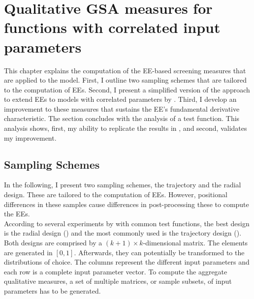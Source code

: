 \documentclass[a4paper,12pt]{article}
\begin{document}
\newpage %

\section{Qualitative GSA measures for functions with correlated input parameters}
\thispagestyle{plain} %

This chapter explains the computation of the EE-based screening measures that are applied to the \cite{Keane.1994} model.
First, I outline two sampling schemes that are tailored to the computation of EEs. Second, I present a simplified version of the approach to extend EEs to models with correlated parameters by \cite{ge2017extending}. Third, I develop an improvement to these measures that sustains the EE's fundamental derivative characteristic. The section concludes with the analysis of a test function. This analysis shows, first, my ability to replicate the results in \cite{ge2017extending}, and second, validates my improvement.


\subsection{Sampling Schemes}

In the following, I present two sampling schemes, the trajectory and the radial design. These are tailored to the computation of EEs. However, positional differences in these samples cause differences in post-processing these to compute the EEs.\\

\noindent
According to several experiments by \cite{campolongo2011screening} with common test functions, the best design is the radial design (\cite{saltelli2002making}) and the most commonly used is the trajectory design (\cite{Morris.1991}).
Both designs are comprised by a $(k + 1) \times k$-dimensional matrix. The elements are generated in $[0,1]$. Afterwards, they can potentially be transformed to the distributions of choice. The columns represent the different input parameters and each row is a complete input parameter vector. To compute the aggregate qualitative measures, a set of multiple matrices, or sample subsets, of input parameters has to be generated.\\
\end{document}
